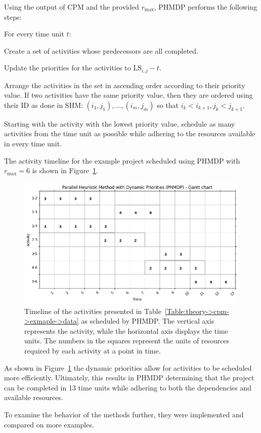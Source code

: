 Using the output of CPM and the provided $r_\mathrm{max}$, PHMDP performs the following steps:

\begin{tight_enumerate}
	\item For every time unit $t$:
	\begin{tight_enumerate}
		\item Create a set of activities whose predecessors are all completed.
		\item Update the priorities for the activities to $\mathrm{LS}_{i, j} - t$.
		\item Arrange the activities in the set in ascending order according to their priority value.
			If two activities have the same priority value, then they are ordered using their ID as done in SHM: $\left(i_1, j_1\right),  \ldots, \left(i_m, j_m\right)$ so that $i_k < i_{k+1}, j_k < j_{k+1}$.
		\item Starting with the activity with the lowest priority value, schedule as many activities from the time unit as possible while adhering to the resources available in every time unit.
	\end{tight_enumerate}
\end{tight_enumerate}

The activity timeline for the example project scheduled using PHMDP with $r_\mathrm{max} = 6$ is shown in Figure~\ref{Figure:theory->phmdp->example->timeline}.

\begin{figure}[ht!]
	\centering
	\includegraphics[width=\linewidth]{images/theory/phmdp_example_project.png}
	\caption{Timeline of the activities presented in Table~\ref{Table:theory->cpm->exmaple->data} as scheduled by PHMDP.
		The vertical axis represents the activity, while the horizontal axis displays the time units.
		The numbers in the squares represent the units of resources required by each activity at a point in time.
	}
	\label{Figure:theory->phmdp->example->timeline}
\end{figure}

As shown in Figure~\ref{Figure:theory->phmdp->example->timeline} the dynamic priorities allow for activities to be scheduled more efficiently.
Ultimately, this results in PHMDP determining that the project can be completed in 13 time units while adhering to both the dependencies and available resources.

To examine the behavior of the methods further, they were implemented and compared on more examples.


